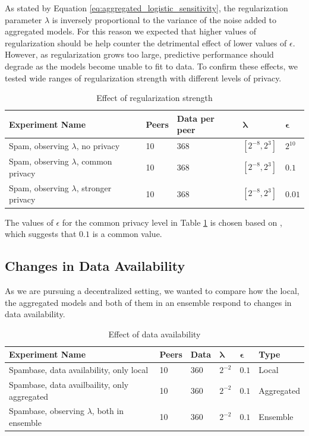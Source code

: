 As stated by Equation \ref{eq:aggregated_logistic_sensitivity}, the regularization parameter $\lambda$ is inversely proportional to the variance of the noise added to aggregated models. For this reason we expected that higher values of regularization should be help counter the detrimental effect of lower values of $\epsilon$. However, as regularization grows too large, predictive performance should degrade as the models become unable to fit to data. To confirm these effects, we tested wide ranges of regularization strength with different levels of privacy.

\begin{table}[h]
	\centering
	\caption{Effect of regularization strength}
	\label{tab:experiments_regularization_strength}
	\begin{tabular}{|l|l|l|l|l|}
		\textbf{Experiment Name}    & \textbf{Peers} & \textbf{Data per peer} & $\boldsymbol{\lambda}$         & $\boldsymbol{\epsilon}$ \\
		\hline
		Spam, observing $\lambda$, no privacy       & 10    & 368  & $[2^{-8}, 2^{3}]$ & $2^{10}$   \\
		Spam, observing $\lambda$, common privacy   & 10    & 368  & $[2^{-8}, 2^{3}]$ & $0.1$      \\
		Spam, observing $\lambda$, stronger privacy & 10    & 368  & $[2^{-8}, 2^{3}]$ & $0.01$    
	\end{tabular}
\end{table}

The values of $\epsilon$ for the  common privacy level in Table \ref{tab:experiments_regularization_strength} is chosen based on \cite{dwork2008differential}, which suggests that $0.1$ is a common value.

\subsection{Changes in Data Availability}

As we are pursuing a decentralized setting, we wanted to compare how the local, the aggregated models and both of them in an ensemble respond to changes in data availability.

\begin{table}[h]
	\centering
	\caption{Effect of data availability}
	\label{tab:experiments_data_availability}
	\begin{tabular}{|l|l|l|l|l|l|}
		\textbf{Experiment Name}                                 & \textbf{Peers} & \textbf{Data} & $\boldsymbol{\lambda}$ & $\boldsymbol{\epsilon}$ & \textbf{Type}       \\
		\hline
		Spambase, data availability, only local         & 10    & 360  & $2^{-2}$  & $0.1$      & Local      \\
		Spambase, data availbaility, only aggregated    & 10    & 360  & $2^{-2}$  & $0.1$      & Aggregated \\
		Spambase, observing $\lambda$, both in ensemble & 10    & 360  & $2^{-2}$  & $0.1$      & Ensemble  
	\end{tabular}
\end{table}

